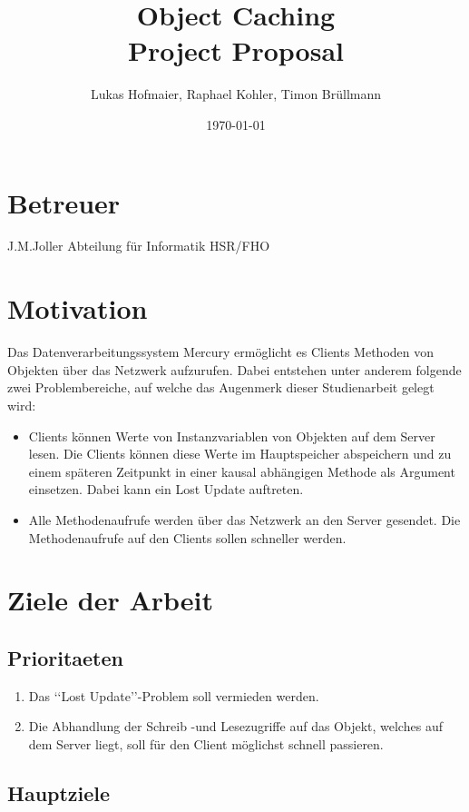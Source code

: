 \documentclass{article}
\title{Object Caching\\Project Proposal}
\author{Lukas Hofmaier, Raphael Kohler, Timon Brüllmann}
\date{\today}
\begin{document}
\maketitle
\section{Betreuer}
J.M.Joller  Abteilung für Informatik HSR/FHO

\section{Motivation}
Das Datenverarbeitungssystem Mercury ermöglicht es Clients Methoden von Objekten über das Netzwerk aufzurufen. Dabei entstehen unter anderem folgende zwei Problembereiche, auf welche das Augenmerk dieser Studienarbeit gelegt wird:

\begin{itemize}
\item Clients können Werte von Instanzvariablen von Objekten auf dem Server lesen. Die Clients können diese Werte im Hauptspeicher abspeichern und zu einem späteren Zeitpunkt in einer kausal abhängigen Methode als Argument einsetzen. Dabei kann ein Lost Update auftreten.
\item Alle Methodenaufrufe werden über das Netzwerk an den Server gesendet. Die Methodenaufrufe auf den Clients sollen schneller werden.
\end{itemize}

\section{Ziele der Arbeit}

\subsection{Prioritaeten}
\label{sec:prioritaeten}

\begin{enumerate}
\item Das ‘‘Lost Update’’-Problem soll vermieden werden.
\item Die Abhandlung der Schreib -und Lesezugriffe auf das Objekt, welches auf dem Server liegt, soll für den Client möglichst schnell passieren.
\end{enumerate}

\subsection{Hauptziele}
\label{sec:hauptziele}
\end{document}
